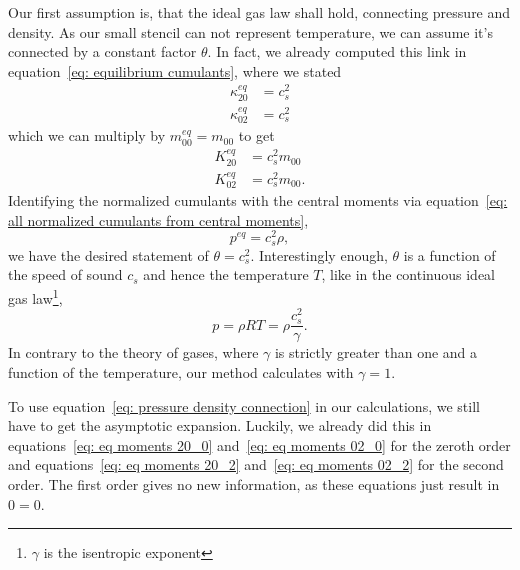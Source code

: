 Our first assumption is, that the ideal gas law shall hold, connecting pressure and density.
As our small stencil can not represent temperature, we can assume it's connected by a constant factor $\theta$.
In fact, we already computed this link in equation~\eqref{eq: equilibrium cumulants}, where we stated
\begin{equation}
  \begin{aligned}
    \kappa_{20}^{eq} & = c_s^2  \\
    \kappa_{02}^{eq} & = c_s^2
  \end{aligned}
\end{equation}
which we can multiply by $m_{00}^{eq} = m_{00}$ to get
\begin{equation}
\label{eq: pressure density connection}
  \begin{aligned}
    K_{20}^{eq} & = c_s^2 m_{00}  \\
    K_{02}^{eq} & = c_s^2 m_{00}.
  \end{aligned}
\end{equation}
Identifying the normalized cumulants with the central moments via equation~\eqref{eq: all normalized cumulants from central moments},
\begin{equation}
\label{eq: pressure density connection quantities}
  p^{eq}  = c_s^2 \rho,
\end{equation}
we have the desired statement of $\theta=c_s^2$.
Interestingly enough, $\theta$ is a function of the speed of sound $c_s$ and hence the temperature $T$, like in the continuous ideal gas law\footnote{$\gamma$ is the isentropic exponent },
\begin{equation}
  p=\rho RT = \rho \frac{c_s^2}{\gamma}.
\end{equation}
In contrary to the theory of gases, where $\gamma$ is strictly greater than one and a function of the temperature, our method calculates with $\gamma=1$.


To use equation~\eqref{eq: pressure density connection} in our calculations, we still have to get the asymptotic expansion.
Luckily, we already did this in equations~\eqref{eq: eq moments 20_0} and~\eqref{eq: eq moments 02_0} for the zeroth order and equations~\eqref{eq: eq moments 20_2} and~\eqref{eq: eq moments 02_2} for the second order.
The first order gives no new information, as these equations just result in $0=0$.
